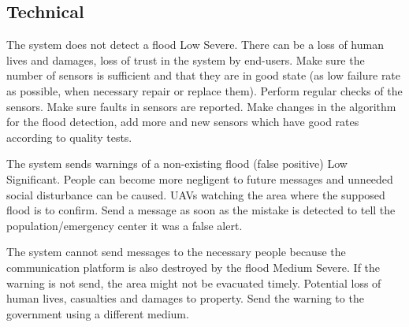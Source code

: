 

\subsection{Technical}

{The system does not detect a flood}
{Low}
{Severe. There can be a loss of human lives and damages, loss of trust in the system by end-users.}
{Make sure the number of sensors is sufficient and that they are in good state (as low failure rate as possible, when necessary repair or replace them). Perform regular checks of the sensors. Make sure faults in sensors are reported. }
{Make changes in the algorithm for the flood detection, add more and new sensors which have good rates according to quality tests.}

{The system sends warnings of a non-existing flood (false positive)} %
{Low}
{Significant. People can become more negligent to future messages and unneeded social disturbance can be caused.}
{UAVs watching the area where the supposed flood is to confirm.}
{Send a message as soon as the mistake is detected to tell the population/emergency center it was a false alert. }

{The system cannot send messages to the necessary people because the communication platform is also destroyed by the flood}
{Medium}
{Severe. If the warning is not send, the area might not be evacuated timely. Potential loss of human lives, casualties and damages to property. }
{}
{Send the warning to the government using a different medium.}
	

